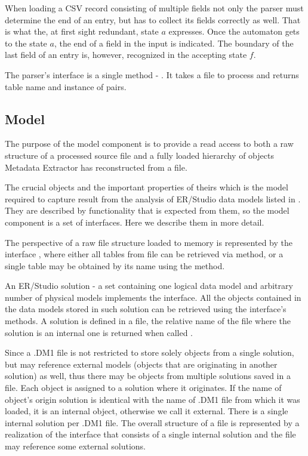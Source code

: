 When loading a CSV record consisting of multiple fields not only the parser must determine the end of an entry, but has to collect its fields correctly as well. That is what the, at first sight redundant, state $a$ expresses. Once the automaton gets to the state $a$, the end of a field in the input is indicated. 
The boundary of the last field of an entry is, however, recognized in the accepting state $f$.

The parser's interface is a single method - . It takes a file to process and returns table name and instance of  pairs.

\subsection{Model}

The purpose of the model component is to provide a read access to both a raw structure of a processed source file and a fully loaded hierarchy of objects Metadata Extractor has reconstructed from a file.

The crucial objects and the important properties of theirs which is the model required to capture result from the analysis of ER/Studio data models listed in . They are described by functionality that is expected from them, so the model component is a set of interfaces. Here we describe them in more detail.

The perspective of a raw file structure loaded to memory is represented by the interface , where either all tables from file can be retrieved via  method, or a single table may be obtained by its name using the  method.

An ER/Studio solution - a set containing one logical data model and arbitrary number of physical models implements the  interface. All the objects contained in the data models stored in such solution can be retrieved using the interface's methods. A solution is defined in a file, the relative name of the file where the solution is an internal one is returned when called .

Since a .DM1 file is not restricted to store solely objects from a single solution, but may reference external models (objects that are originating in another solution) as well, thus there may be objects from multiple solutions saved in a file. Each object is assigned to a solution where it originates.
If the name of object's origin solution is identical with the name of .DM1 file from which it was loaded, it is an internal object, otherwise we call it external. There is a single internal solution per .DM1 file. 
The overall structure of a file is represented by a realization of the  interface that consists of a single internal solution and the file may reference some external solutions.

